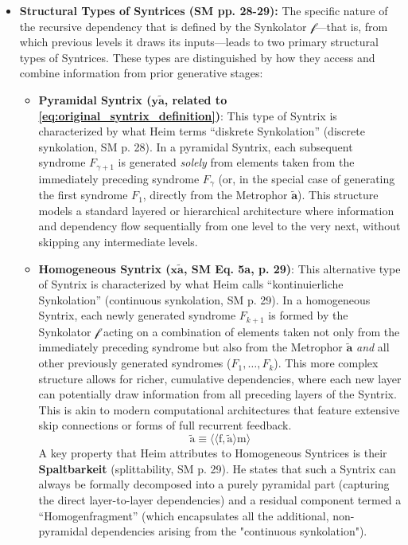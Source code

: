 \documentclass[12pt]{article}
\newcommand{\q}[1]{\enquote{#1}}
\newcommand{\syntrix}{\bm{y\widetilde{a}}}
\newcommand{\homogeneoussyntrix}{\bm{x\widetilde{a}}}
\newcommand{\metrophor}{\bm{\widetilde{a}}}
\newcommand{\synkolator}{\mathcal{f}}
\newcommand{\syndrom}{F} %
\begin{document}
\begin{itemize}
    \item \textbf{Structural Types of Syntrices (SM pp. 28-29):}
    The specific nature of the recursive dependency that is defined by the Synkolator \( \synkolator \)—that is, from which previous levels it draws its inputs—leads to two primary structural types of Syntrices. These types are distinguished by how they access and combine information from prior generative stages:
    \begin{itemize}
        \item \textbf{Pyramidal Syntrix (\( \syntrix \), related to \eqref{eq:original_syntrix_definition})}: This type of Syntrix is characterized by what Heim terms \q{diskrete Synkolation} (discrete synkolation, SM p. 28). In a pyramidal Syntrix, each subsequent syndrome \( \syndrom_{\gamma+1} \) is generated \textit{solely} from elements taken from the immediately preceding syndrome \( \syndrom_\gamma \) (or, in the special case of generating the first syndrome \( \syndrom_1 \), directly from the Metrophor \( \metrophor \)). This structure models a standard layered or hierarchical architecture where information and dependency flow sequentially from one level to the very next, without skipping any intermediate levels.
        \item \textbf{Homogeneous Syntrix (\( \homogeneoussyntrix \), SM Eq. 5a, p. 29)}: This alternative type of Syntrix is characterized by what Heim calls \q{kontinuierliche Synkolation} (continuous synkolation, SM p. 29). In a homogeneous Syntrix, each newly generated syndrome \( \syndrom_{k+1} \) is formed by the Synkolator \( \synkolator \) acting on a combination of elements taken not only from the immediately preceding syndrome but also from the Metrophor \( \metrophor \) \textit{and} all other previously generated syndromes (\( \syndrom_1, \dots, \syndrom_k \)). This more complex structure allows for richer, cumulative dependencies, where each new layer can potentially draw information from all preceding layers of the Syntrix. This is akin to modern computational architectures that feature extensive skip connections or forms of full recurrent feedback.
        \begin{equation}
        \tilde{\mathrm{a}} \equiv \langle\langle \mathrm{f}, \tilde{\mathrm{a}} \rangle \mathrm{m} \rangle \tag{5a}
        \label{eq:original_homogeneous_syntrix}
        \end{equation}
        A key property that Heim attributes to Homogeneous Syntrices is their \textbf{Spaltbarkeit} (splittability, SM p. 29). He states that such a Syntrix can always be formally decomposed into a purely pyramidal part (capturing the direct layer-to-layer dependencies) and a residual component termed a \q{Homogenfragment} (which encapsulates all the additional, non-pyramidal dependencies arising from the "continuous synkolation").
    \end{itemize}


\end{itemize}
\end{document}
